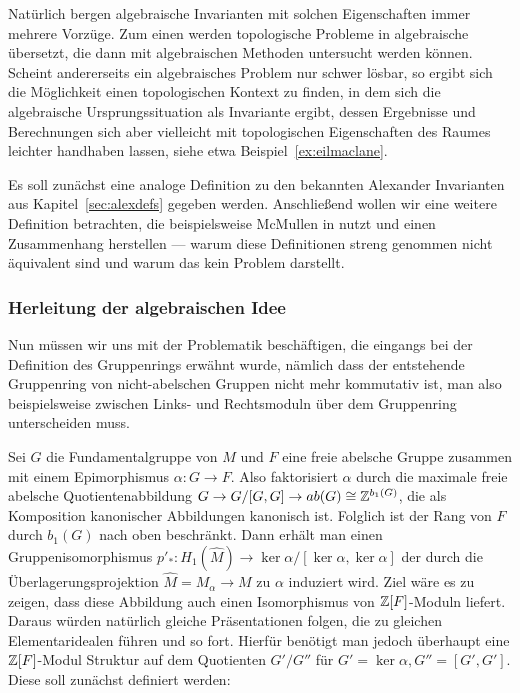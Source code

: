Natürlich bergen algebraische Invarianten mit solchen Eigenschaften immer mehrere Vorzüge. Zum einen werden topologische Probleme in algebraische übersetzt, die dann mit algebraischen Methoden untersucht werden können. Scheint andererseits ein algebraisches Problem nur schwer lösbar, so ergibt sich die Möglichkeit einen topologischen Kontext zu finden, in dem sich die algebraische Ursprungssituation als Invariante ergibt, dessen Ergebnisse und Berechnungen sich aber vielleicht mit topologischen Eigenschaften des Raumes leichter handhaben lassen, siehe etwa Beispiel~\ref{ex:eilmaclane}.

Es soll zunächst eine analoge Definition zu den bekannten Alexander Invarianten aus Kapitel~\ref{sec:alexdefs} gegeben werden. Anschließend wollen wir eine weitere Definition betrachten, die beispielsweise McMullen in \cite{MCMULLEN.2002} nutzt und einen Zusammenhang herstellen --- warum diese Definitionen streng genommen nicht äquivalent sind und warum das kein Problem darstellt.

\subsubsection{Herleitung der algebraischen Idee}
    
Nun müssen wir uns mit der Problematik beschäftigen, die eingangs bei der Definition des Gruppenrings erwähnt wurde, nämlich dass der entstehende Gruppenring von nicht-abelschen Gruppen nicht mehr kommutativ ist, man also beispielsweise zwischen Links- und Rechtsmoduln über dem Gruppenring unterscheiden muss.

Sei $G$ die Fundamentalgruppe von $M$ und $F$ eine freie abelsche Gruppe zusammen mit einem Epimorphismus $\alpha:G \to F$. Also faktorisiert $\alpha$ durch die maximale freie abelsche Quotientenabbildung $G \to G/[G,G] \to ab(G) \cong \mathbb{Z}^{b_1(G)}$, die als Komposition kanonischer Abbildungen kanonisch ist. Folglich ist der Rang von $F$ durch $b_1(G)$ nach oben beschränkt. Dann erhält man einen Gruppenisomorphismus $p'_*: H_1(\hat M) \to \ker\alpha/[\ker\alpha,\ker\alpha]$ der durch die Überlagerungsprojektion $\hat M = M_\alpha \to M$ zu $\alpha$ induziert wird. Ziel wäre es zu zeigen, dass diese Abbildung auch einen Isomorphismus von $\mathbb{Z}[F]$-Moduln liefert. Daraus würden natürlich gleiche Präsentationen folgen, die zu gleichen Elementaridealen führen und so fort. Hierfür benötigt man jedoch überhaupt eine $\mathbb{Z}[F]$-Modul Struktur auf dem Quotienten $G'/G''$ für $G'=\ker\alpha, G''=[G',G']$. Diese soll zunächst definiert werden:

